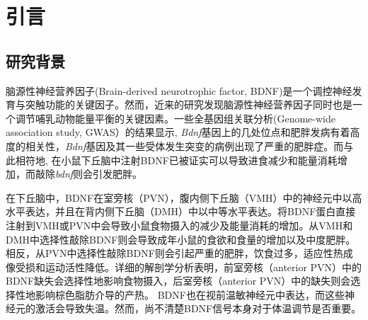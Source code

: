 \chapter{引言}\label{chap:introduction}

\section{研究背景}
脑源性神经营养因子(Brain-derived neurotrophic factor, BDNF)是一个调控神经发育与突触功能的关键因子。然而，近来的研究发现脑源性神经营养因子同时也是一个调节哺乳动物能量平衡的关键因素\citep{xu2016neurotrophic}。一些全基因组关联分析(Genome-wide association study, GWAS）的结果显示, \textit{Bdnf}基因上的几处位点和肥胖发病有着高度的相关性\citep{thorleifsson2009genome,speliotes2010association,wen2012meta}，\textit{Bdnf}基因及其一些受体发生突变的病例出现了严重的肥胖症\citep{gray2006hyperphagia}。而与此相符地, 在小鼠下丘脑中注射BDNF已被证实可以导致进食减少和能量消耗增加\citep{wang2007abrain,wang2007bbrain,wang2010brain,godar2011reduction}，而敲除\textit{bdnf}则会引发肥胖\citep{xu2003brain, unger2007selective, liao2012dendritically}。

在下丘脑中，BDNF在室旁核（PVN），腹内侧下丘脑（VMH）中的神经元中以高水平表达，并且在背内侧下丘脑（DMH）中以中等水平表达\citep{xu2003brain, unger2007selective,liao2012dendritically,an2015discrete}。将BDNF蛋白直接注射到VMH或PVN中会导致小鼠食物摄入的减少及能量消耗的增加\citep{wang2007abrain,wang2007bbrain,godar2011reduction}。从VMH和DMH中选择性敲除BDNF则会导致成年小鼠的食欲和食量的增加以及中度肥胖\citep{unger2007selective}。相反，从PVN中选择性敲除BDNF则会引起严重的肥胖，饮食过多，适应性热成像受损和运动活性降低\citep{an2015discrete}。详细的解剖学分析表明，前室旁核（anterior PVN）中的BDNF缺失会选择性地影响食物摄入，后室旁核（anterior PVN）中的缺失则会选择性地影响棕色脂肪介导的产热\citep{an2015discrete}。 BDNF也在视前温敏神经元中表达\citep{tan2016warm,zhao2017hypothalamic}，而这些神经元的激活会导致失温\citep{tan2016warm}。然而，尚不清楚BDNF信号本身对于体温调节是否重要。

